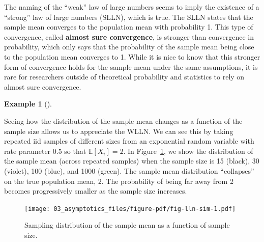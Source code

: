\documentclass[
  letterpaper,
  DIV=11,
  numbers=noendperiod]{scrreprt}
\newcommand{\E}{\mathbb{E}}
\theoremstyle{definition}
\newtheorem{example}{Example}[chapter]
\theoremstyle{definition}
\theoremstyle{plain}
\theoremstyle{remark}
\begin{document}
\begin{tcolorbox}[enhanced jigsaw, colbacktitle=quarto-callout-note-color!10!white, breakable, toptitle=1mm, opacityback=0, leftrule=.75mm, rightrule=.15mm, coltitle=black, opacitybacktitle=0.6, toprule=.15mm, arc=.35mm, bottomtitle=1mm, titlerule=0mm, title=\textcolor{quarto-callout-note-color}{\faInfo}\hspace{0.5em}{Note}, colframe=quarto-callout-note-color-frame, bottomrule=.15mm, colback=white, left=2mm]

The naming of the ``weak'' law of large numbers seems to imply the
existence of a ``strong'' law of large numbers (SLLN), which is true.
The SLLN states that the sample mean converges to the population mean
with probability 1. This type of convergence, called \textbf{almost sure
convergence}, is stronger than convergence in probability, which only
says that the probability of the sample mean being close to the
population mean converges to 1. While it is nice to know that this
stronger form of convergence holds for the sample mean under the same
assumptions, it is rare for researchers outside of theoretical
probability and statistics to rely on almost sure convergence.

\end{tcolorbox}

\begin{example}[]\protect\hypertarget{exm-lln}{}\label{exm-lln}

Seeing how the distribution of the sample mean changes as a function of
the sample size allows us to appreciate the WLLN. We can see this by
taking repeated iid samples of different sizes from an exponential
random variable with rate parameter 0.5 so that \(\E[X_i] = 2\). In
Figure~\ref{fig-lln-sim}, we show the distribution of the sample mean
(across repeated samples) when the sample size is 15 (black), 30
(violet), 100 (blue), and 1000 (green). The sample mean distribution
``collapses'' on the true population mean, 2. The probability of being
far away from 2 becomes progressively smaller as the sample size
increases.

\begin{figure}

{\centering \texttt{[image: 03\_asymptotics\_files/figure-pdf/fig-lln-sim-1.pdf]}

}

\caption{\label{fig-lln-sim}Sampling distribution of the sample mean as
a function of sample size.}

\end{figure}

\end{example}
\end{document}
